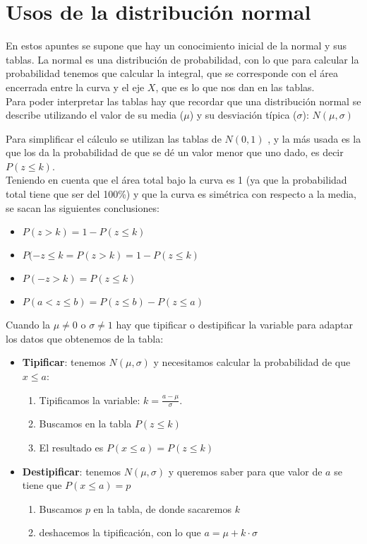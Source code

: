 \documentclass[a4paper,10pt,answers]{exam}
\begin{document}
\section*{Usos de la distribución normal}
En estos apuntes se supone que hay un conocimiento inicial de la normal y sus tablas. La normal es una distribución de probabilidad, con lo que para calcular la probabilidad tenemos que calcular la integral, que se corresponde con el área encerrada entre la curva y el eje $X$, que es lo que nos dan en las tablas.\\

Para poder interpretar las tablas hay que recordar que una distribución normal se describe utilizando el valor de su media ($\mu$) y su desviación típica ($\sigma$): $N(\mu, \sigma)$

Para simplificar el cálculo se utilizan las tablas de $N(0,1)$ , y la más usada es la que los da la probabilidad de que se dé un valor menor que uno dado, es decir $P(z \leq k)$.\\

Teniendo en cuenta que el área total bajo la curva es 1 (ya que la probabilidad total tiene que ser del 100\%) y que la curva es simétrica con respecto a la media, se sacan las siguientes conclusiones:
\begin{itemize}
\item $P(z > k) = 1 - P(z \leq k)$
\item $P(-z \leq k = P(z > k) = 1 - P(z \leq k)$
\item $P(-z > k) = P (z \leq k)$
\item $P(a < z \leq b) = P (z \leq b) - P(z \leq a)$
\end{itemize}

Cuando la $\mu \neq 0$ o $\sigma \neq 1$ hay que tipificar o destipificar la variable para adaptar los datos que obtenemos de la tabla:
\begin{itemize}
	\item \textbf{Tipificar}: tenemos $N(\mu, \sigma)$ y necesitamos calcular la probabilidad de que $x \leq a$:
	\begin{enumerate}
		\item Tipificamos la variable: $k = \frac{a - \mu }{\sigma}$.
		\item Buscamos en la tabla $P(z \leq k)$
		\item El resultado es $P(x \leq a) = P ( z\leq k)$
	\end{enumerate}
	\item \textbf{Destipificar}: tenemos $N(\mu, \sigma)$ y queremos saber para que valor de $a$ se tiene que $P(x \leq a) = p$
	\begin{enumerate}
		\item Buscamos $p$ en la tabla, de donde sacaremos $k$
		\item deshacemos la tipificación, con lo que $a = \mu + k \cdot \sigma$
	\end{enumerate}
\end{itemize}
\end{document}
